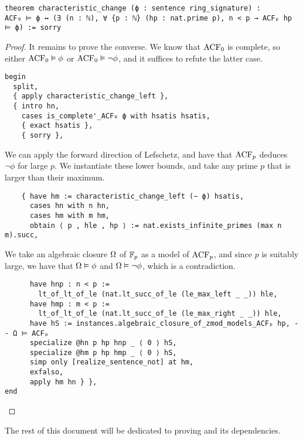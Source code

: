 \begin{lstlisting}
theorem characteristic_change (ϕ : sentence ring_signature) :
ACF₀ ⊨ ϕ ↔ (∃ (n : ℕ), ∀ {p : ℕ} (hp : nat.prime p), n < p → ACFₚ hp ⊨ ϕ) := sorry \end{lstlisting}
\begin{proof}
It remains to prove the converse.
We know that $\operatorname{ACF}_{0}$ is complete,
so either $\operatorname{ACF}_{0} \vDash \phi$ or $\operatorname{ACF}_{0} \vDash \neg \phi$,
and it suffices to refute the latter case.

\begin{lstlisting}
begin
  split,
  { apply characteristic_change_left },
  { intro hn,
    cases is_complete'_ACF₀ ϕ with hsatis hsatis,
    { exact hsatis },
    { sorry }, \end{lstlisting}

We can apply the forward direction of Lefschetz,
and have that $\operatorname{ACF}_{p}$ deduces $\neg \phi$ for large $p$.
We instantiate these lower bounds, and take any prime $p$ that is larger
than their maximum.

\begin{lstlisting}
    { have hm := characteristic_change_left (∼ ϕ) hsatis,
      cases hn with n hn,
      cases hm with m hm,
      obtain ⟨ p , hle , hp ⟩ := nat.exists_infinite_primes (max n m).succ, \end{lstlisting}

We take an algebraic closure $\Omega$ of $\mathbb{F}_{p}$ as a model of $\operatorname{ACF}_{p}$,
and since $p$ is suitably large, we have that $\Omega \vDash \phi$ and
$\Omega \vDash \neg \phi$, which is a contradiction.

\begin{lstlisting}
      have hnp : n < p :=
        lt_of_lt_of_le (nat.lt_succ_of_le (le_max_left _ _)) hle,
      have hmp : m < p :=
        lt_of_lt_of_le (nat.lt_succ_of_le (le_max_right _ _)) hle,
      have hS := instances.algebraic_closure_of_zmod_models_ACFₚ hp, -- Ω ⊨ ACFₚ
      specialize @hn p hp hnp _ ⟨ 0 ⟩ hS,
      specialize @hm p hp hmp _ ⟨ 0 ⟩ hS,
      simp only [realize_sentence_not] at hm,
      exfalso,
      apply hm hn } },
end \end{lstlisting}

\end{proof}

The rest of this document will be dedicated to proving  and its dependencies.
